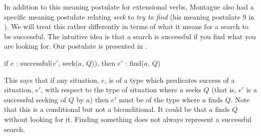 In addition to this meaning postulate for extensional verbs, Montague
also had a specific meaning postulate relating \textit{seek} to
\textit{try to find} (his meaning postulate 9 in
\citealp{Montague1973}).  We will treat this rather differently in
terms of what it means for a search to be successful.  The intuitive
idea is that a search is successful if you find what you are looking
for.  Our postulate is presented in \nexteg{}.
\begin{ex} 
if $e$ : successful($e'$, seek($a$, $Q$)), then $e'$ : find($a$, $Q$) 
\label{ex:mp-seek}
\end{ex} 
This says that if any situation, $e$, is of a type which predicates
success of a situation, $e'$, with respect to the type of situation
where $a$ seeks $Q$ (that is, $e'$ is a successful seeking of $Q$ by
$a$) then $e'$ must be of the type where $a$ finds $Q$.  Note that
this is a conditional but not a biconditional.  It could be that $a$
finds $Q$ without looking for it.  Finding something does not always
represent a successful search.

